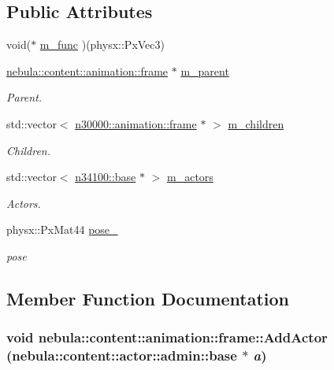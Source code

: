 \subsection*{Public Attributes}
\begin{DoxyCompactItemize}
\item 
void($\ast$ \hyperlink{classnebula_1_1content_1_1animation_1_1frame_a2464ca0f328687c70a552b6887962109}{m\_\-func} )(physx::PxVec3)
\item 
\hyperlink{classnebula_1_1content_1_1animation_1_1frame}{nebula::content::animation::frame} $\ast$ \hyperlink{classnebula_1_1content_1_1animation_1_1frame_a27a0d6f520afb2ebecd58cc9ccf3ea3b}{m\_\-parent}
\begin{DoxyCompactList}\small\item\em Parent. \item\end{DoxyCompactList}\item 
std::vector$<$ \hyperlink{classnebula_1_1content_1_1animation_1_1frame}{n30000::animation::frame} $\ast$ $>$ \hyperlink{classnebula_1_1content_1_1animation_1_1frame_ad3574adbcc373211213b6f0adec6c1c6}{m\_\-children}
\begin{DoxyCompactList}\small\item\em Children. \item\end{DoxyCompactList}\item 
std::vector$<$ \hyperlink{classnebula_1_1content_1_1actor_1_1admin_1_1base}{n34100::base} $\ast$ $>$ \hyperlink{classnebula_1_1content_1_1animation_1_1frame_adf0741bb9645a0fe8d90d2e57c0e96df}{m\_\-actors}
\begin{DoxyCompactList}\small\item\em Actors. \item\end{DoxyCompactList}\item 
physx::PxMat44 \hyperlink{classnebula_1_1content_1_1animation_1_1frame_aae4b473bf2a55c2a76b205cffdeb1b26}{pose\_\-}
\begin{DoxyCompactList}\small\item\em pose \item\end{DoxyCompactList}\end{DoxyCompactItemize}


\subsection{Member Function Documentation}
\hypertarget{classnebula_1_1content_1_1animation_1_1frame_a8ea4022bfcdd00681507f7b4a79fb9c1}{
\subsubsection[{AddActor}]{\setlength{\rightskip}{0pt plus 5cm}void nebula::content::animation::frame::AddActor ({\bf nebula::content::actor::admin::base} $\ast$ {\em a})}}
\label{classnebula_1_1content_1_1animation_1_1frame_a8ea4022bfcdd00681507f7b4a79fb9c1}


